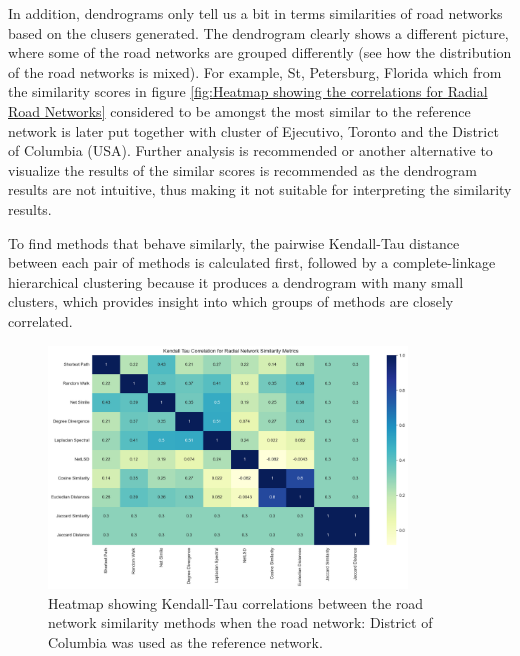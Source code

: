In addition, dendrograms only tell us a bit in terms similarities of road networks based on the clusers generated. The dendrogram clearly shows a different picture, where some of the road networks are grouped differently (see how the distribution of the road networks is mixed). For example, St, Petersburg, Florida which from the similarity scores in figure \ref{fig:Heatmap showing the correlations for Radial Road Networks} considered to be amongst the most similar to the reference network is later put together with cluster of Ejecutivo, Toronto and the District of Columbia (USA). Further analysis is recommended or another alternative to visualize the results of the similar scores is recommended as the dendrogram results are not intuitive, thus making it not suitable for interpreting the similarity results.

To find methods that behave similarly, the pairwise Kendall-Tau distance between each pair of methods is calculated first, followed by a complete-linkage hierarchical clustering because it produces a dendrogram with many small clusters, which provides insight into which groups of methods are closely correlated.

\begin{figure}[!ht]
\centering
\includegraphics[width=0.85\textwidth,center]{picture/Radial/radial2.png}
\caption[Heatmap showing Kendall-Tau correlations between the road network similarity methods for Radial Road Networks]{Heatmap showing Kendall-Tau correlations between the road network similarity methods when the road network: District of Columbia was used as the reference network.}
\label{fig:network ranking radial}
\end{figure}

